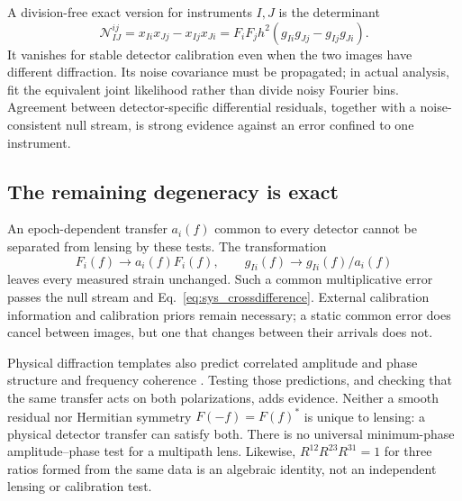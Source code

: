 A division-free exact version for instruments \(I,J\) is the determinant
\begin{equation}
 \mathcal N_{IJ}^{ij}=x_{Ii}x_{Jj}-x_{Ij}x_{Ji}
 =F_iF_jh^2(g_{Ii}g_{Jj}-g_{Ij}g_{Ji}).
 \label{eq:sys_crossdifference}
\end{equation}
It vanishes for stable detector calibration even when the two images have
different diffraction. Its noise covariance must be propagated; in actual
analysis, fit the equivalent joint likelihood rather than divide noisy Fourier
bins. Agreement between detector-specific differential residuals, together with
a noise-consistent null stream, is strong evidence against an error confined to
one instrument.

\subsection{The remaining degeneracy is exact}

An epoch-dependent transfer \(a_i(f)\) common to every detector cannot be
separated from lensing by these tests. The transformation
\begin{equation}
 F_i(f)\longrightarrow a_i(f)F_i(f),\qquad
 g_{Ii}(f)\longrightarrow g_{Ii}(f)/a_i(f)
\end{equation}
leaves every measured strain unchanged. Such a common multiplicative error
passes the null stream and Eq.~\eqref{eq:sys_crossdifference}. External calibration
information and calibration priors remain necessary; a static common error
does cancel between images, but one that changes between their arrivals does not.

Physical diffraction templates also predict correlated amplitude and phase
structure and frequency coherence \cite{oguri2022}. Testing those predictions,
and checking that the same transfer acts on both polarizations, adds evidence.
Neither a smooth residual nor Hermitian symmetry \(F(-f)=F(f)^*\) is unique to
lensing: a physical detector transfer can satisfy both. There is no universal
minimum-phase amplitude--phase test for a multipath lens. Likewise,
\(R^{12}R^{23}R^{31}=1\) for three ratios formed from the same data is an
algebraic identity, not an independent lensing or calibration test.
